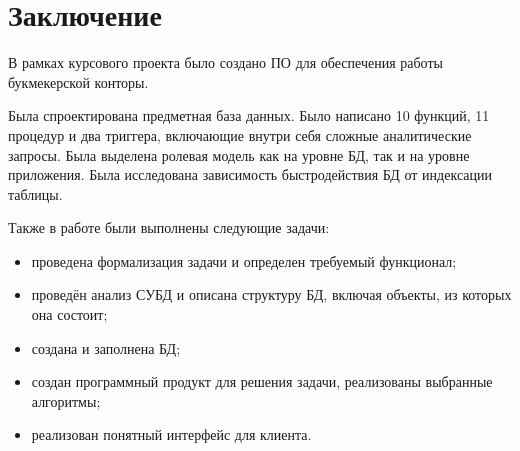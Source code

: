 \chapter*{Заключение}
В рамках курсового проекта было создано ПО для обеспечения работы букмекерской конторы.

Была спроектирована предметная база данных.
Было написано 10 функций, 11 процедур и два триггера, включающие внутри себя сложные аналитические запросы. 
Была выделена ролевая модель как на уровне БД, так и на уровне приложения. 
Была исследована зависимость быстродействия БД от индексации таблицы.

Также в работе были выполнены следующие задачи:
\begin{itemize}
	\item проведена формализация задачи и определен требуемый функционал;
	\item проведён анализ СУБД и описана структуру БД, включая объекты, из которых она состоит;
	\item создана и заполнена БД;
	\item создан программный продукт для решения задачи, реализованы выбранные алгоритмы;
	\item реализован понятный интерфейс для клиента.
\end{itemize}